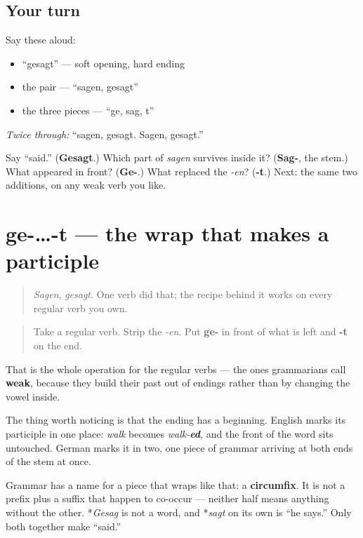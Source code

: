 \subsection*{Your turn}
Say these aloud:

\begin{itemize}
\raggedright
  \item \textquotedblleft{}gesagt\textquotedblright{} — soft opening, hard ending
  \item the pair — \textquotedblleft{}sagen, gesagt\textquotedblright{}
  \item the three pieces — \textquotedblleft{}ge, sag, t\textquotedblright{}
\end{itemize}

\emph{Twice through:} \textquotedblleft{}sagen, gesagt. Sagen, gesagt.\textquotedblright{}

\begin{tcolorbox}[breakable,colback=teal!4,colframe=teal!35!black,title={Before you move on}]
Say \textquotedblleft{}said.\textquotedblright{} (\textbf{Gesagt}.) Which part of \emph{sagen} survives inside it? (\textbf{Sag-}, the stem.) What appeared in front? (\textbf{Ge-}.) What replaced the \emph{-en}? (\textbf{-t}.) Next: the same two additions, on any weak verb you like.
\end{tcolorbox}
\section[ge-…-t]{ge-…-t — the wrap that makes a participle}

\label{lesson:GE-C15-partizip}



\begin{quote}
\emph{Sagen}, \emph{gesagt}. One verb did that; the recipe behind it works on every regular verb you own.
\end{quote}

\begin{grammarlens}[title={Grammar Lens: ge- in front, -t behind}]
\begin{quote}
Take a regular verb. Strip the \emph{-en}. Put \textbf{ge-} in front of what is left and \textbf{-t} on the end.
\end{quote}

That is the whole operation for the regular verbs — the ones grammarians call \textbf{weak}, because they build their past out of endings rather than by changing the vowel inside.

The thing worth noticing is that the ending has a beginning. English marks its participle in one place: \emph{walk} becomes \emph{walk-\textbf{ed}}, and the front of the word sits untouched. German marks it in two, one piece of grammar arriving at both ends of the stem at once.

Grammar has a name for a piece that wraps like that: a \textbf{circumfix}. It is not a prefix plus a suffix that happen to co-occur — neither half means anything without the other. *\emph{Gesag} is not a word, and *\emph{sagt} on its own is \textquotedblleft{}he says.\textquotedblright{} Only both together make \textquotedblleft{}said.\textquotedblright{}
\end{grammarlens}

